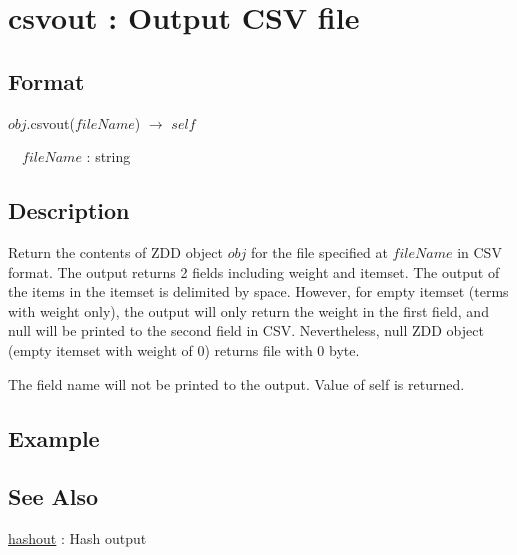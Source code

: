 
\section{csvout : Output CSV file\label{sect:csvout}}
\subsection*{Format}
$obj$.csvout($fileName$) $\rightarrow$ $self$ 

~~$fileName$ : string

\subsection*{Description}

Return the contents of ZDD object $obj$ for the file specified at $fileName$ in CSV format. 
The output returns 2 fields including weight and itemset. 
The output of the items in the itemset is delimited by space.  
However, for empty itemset (terms with weight only), the output will only return the weight in the first field, and null will be printed to the second field in CSV.  
Nevertheless, null ZDD object (empty itemset with weight of 0) returns file with 0 byte. 


The field name will not be printed to the output. Value of self is returned.


\subsection*{Example}


\subsection*{See Also}
\hyperref[sect:hashout]{hashout} : Hash output

